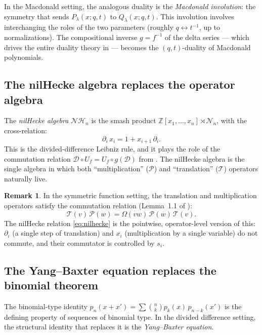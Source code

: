 \documentclass[11pt]{amsart}
\theoremstyle{definition}
\newtheorem{remark}[theorem]{Remark}
\newcommand{\Z}{\mathbb{Z}}
\newcommand{\cD}{\mathcal{D}}
\newcommand{\cT}{\mathcal{T}}
\newcommand{\cP}{\mathcal{P}}
\newcommand{\cN}{\mathcal{N}}
\newcommand{\NH}{\mathcal{NH}}
\begin{document}
In the Macdonald setting, the analogous duality is the
\emph{Macdonald involution}: the symmetry that sends
$P_\lambda(x; q, t)$ to $Q_\lambda(x; q, t)$. This involution
involves interchanging the roles of the two parameters (roughly
$q \leftrightarrow t^{-1}$, up to normalizations). The
compositional inverse $g = f^{-1}$ of the delta series --- which
drives the entire duality theory in \cite{Langer} --- becomes the
$(q, t)$-duality of Macdonald polynomials.

\subsection{The nilHecke algebra replaces the operator algebra}

The \emph{nilHecke algebra} $\NH_n$ is the smash product
$\Z[x_1, \dots, x_n] \rtimes \cN_n$, with the cross-relation:
\begin{equation}\label{eq:nilhecke}
  \partial_i\, x_i = 1 + x_{i+1}\, \partial_i.
\end{equation}
This is the divided-difference Leibniz rule, and it plays the role
of the commutation relation
$\cD \circ U_f = U_f \circ g(\cD)$ from
\cite[Prop.~1.2]{Langer}. The nilHecke algebra is the single
algebra in which both ``multiplication'' ($\cP$) and
``translation'' ($\cT$) operators naturally live.

\begin{remark}
  In the symmetric function setting, the translation and
  multiplication operators satisfy the commutation relation
  (Lemma~1.1 of \cite{Langer}):
  \[
    \cT(v)\, \cP(w) = \Omega(vw)\, \cP(w)\, \cT(v).
  \]
  The nilHecke relation \eqref{eq:nilhecke} is the pointwise,
  operator-level version of this: $\partial_i$ (a single step of
  translation) and $x_i$ (multiplication by a single variable)
  do not commute, and their commutator is controlled by $s_i$.
\end{remark}

\subsection{The Yang--Baxter equation replaces the binomial theorem}

The binomial-type identity
$p_n(x + x') = \sum \binom{n}{k} p_k(x)\, p_{n-k}(x')$ is the
defining property of sequences of binomial type. In the divided
difference setting, the structural identity that replaces it is the
\emph{Yang--Baxter equation}.
\end{document}
